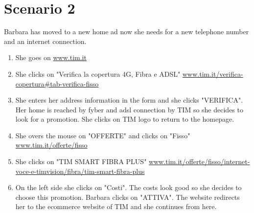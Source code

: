 \section{Scenario 2}
Barbara has moved to a new home ad now she needs for a new telephone number and an internet connection.

\begin{enumerate}
	\item She goes on \url{www.tim.it}
	\item She clicks on "Verifica la copertura 4G, Fibra e ADSL" \url{www.tim.it/verifica-copertura#tab-verifica-fisso}
	\item She enters her address information in the form and she clicks "VERIFICA". Her home is reached by fyber and adsl connection by TIM so she decides to look for a promotion. She clicks on TIM logo to return to the homepage.
	\item She overs the mouse on "OFFERTE" and clicks on "Fisso" \url{www.tim.it/offerte/fisso}
	\item She clicks on "TIM SMART FIBRA PLUS" \url{www.tim.it/offerte/fisso/internet-voce-e-timvision/fibra/tim-smart-fibra-plus}
	\item On the left side she clicks on "Costi". The costs look good so she decides to choose this promotion. Barbara clicks on "ATTIVA". The website redirects her to the ecommerce website of TIM and she continues from here.
\end{enumerate}

